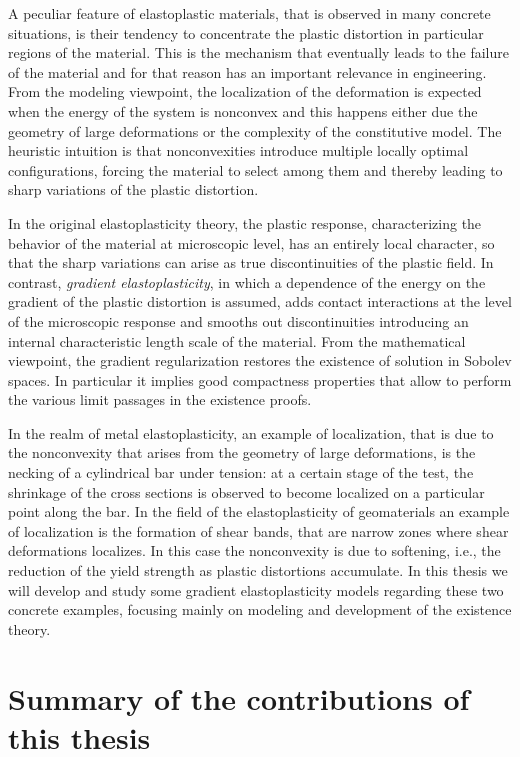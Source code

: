 \documentclass[a4paper,10pt,oneside]{amsbook}
\numberwithin{section}{chapter}
\numberwithin{equation}{chapter}
\theoremstyle{definition}
\begin{document}
A peculiar feature of elastoplastic materials, that is observed in many concrete situations, is their tendency to concentrate the plastic distortion in particular regions of the material. This is the mechanism that eventually leads to the failure of the material and for that reason has an important relevance in engineering. From the modeling viewpoint, the localization of the deformation is expected when the energy of the system is nonconvex and this happens either due the geometry of large deformations or the complexity of the constitutive model. The heuristic intuition is that nonconvexities introduce multiple locally optimal configurations, forcing the material to select among them and thereby leading to sharp variations of the plastic distortion.

In the original elastoplasticity theory, the plastic response, characterizing the behavior of the material at microscopic level, has an entirely local character, so that the sharp variations can arise as true discontinuities of the plastic field. In contrast, \emph{gradient elastoplasticity}, in which a dependence of the energy on the gradient of the plastic distortion is assumed, adds contact interactions at the level of the microscopic response and smooths out discontinuities introducing an internal characteristic length scale of the material. From the mathematical viewpoint, the gradient regularization restores the existence of solution in Sobolev spaces. In particular it implies good compactness properties that allow to perform the various limit passages in the existence proofs.

In the realm of metal elastoplasticity, an example of localization, that is due to the nonconvexity that arises from the geometry of large deformations, is the necking of a cylindrical bar under tension: at a certain stage of the test, the shrinkage of the cross sections is observed to become localized on a particular point along the bar. In the field of the elastoplasticity of geomaterials an example of localization is the formation of shear bands, that are narrow zones where shear deformations localizes. In this case the nonconvexity is due to softening, i.e., the reduction of the yield strength as plastic distortions accumulate. In this thesis we will develop and study some gradient elastoplasticity models regarding these two concrete examples, focusing mainly on modeling and development of the existence theory.

\section*{Summary of the contributions of this thesis}
\end{document}
